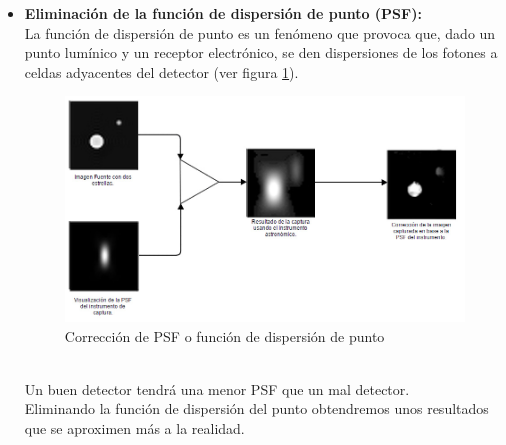 \begin{itemize}
		Una característica que usarán nuestros algoritmos, es analizar el gradiente local de los halos alrededor de los puntos de máxima intensidad para determinar la existencia de galaxias.


		\item \textbf{Eliminación de la función de dispersión de punto (PSF):}\\
		La función de dispersión de punto es un fenómeno que provoca que, dado un punto lumínico y un receptor electrónico, se den dispersiones de	los fotones a celdas adyacentes del detector (ver figura \ref{fig:PSF}). 
			\begin{figure}[!htb]
				\centering
				\includegraphics[width=1\textwidth]{images/PSF-explicada2.jpg}
				\caption{\label{fig:PSF}{\small Corrección de PSF o función de dispersión de punto}}
			\end{figure}
		\\Un buen detector tendrá una menor PSF que un mal detector.\\
		Eliminando la función de dispersión del punto obtendremos unos resultados que se aproximen más a la realidad.\\


\end{itemize}
